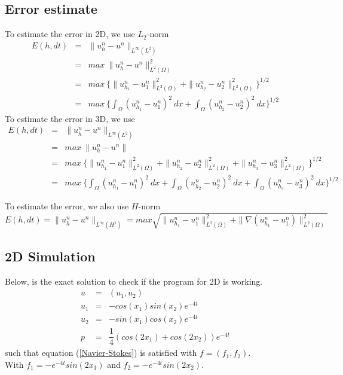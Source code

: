 \documentclass[a4paper,10pt]{article}
\begin{document}
\subsection{Error estimate}
To estimate the error in 2D, we use $ L_{2} $-norm
\begin{eqnarray}\nonumber
E(h,dt) &=& \| u_{h}^{n}-u^{n} \|_{L^\infty(L^2)} \\ \nonumber
&=& max \ \| u_{h}^{n}-u^{n} \|_{L^2(\Omega)}^{2} \\ \nonumber
&=& max \ \{ \| u_{h_{1}}^{n}-u_{1}^{n} \|_{L^2(\Omega)}^{2} + \| u_{h_{2}}^{n}-u_{2}^{n} \|_{L^2(\Omega)}^{2} \}^{1/2} \\ \nonumber
&=& max \ \{ \int_{\Omega} (u_{h_{1}}^{n}-u_{1}^{n})^2 \ dx + \int_{\Omega} (u_{h_{2}}^{n}-u_{2}^{n})^2 \ dx \}^{1/2}
\end{eqnarray}
To estimate the error in 3D, we use
\begin{eqnarray}\nonumber
E(h,dt) &=& \| u_{h}^{n}-u^{n} \|_{L^\infty(L^2)} \\ \nonumber
&=& max \ \| u_{h}^{n}-u^{n} \| \\ \nonumber
&=& max \ \{ \| u_{h_{1}}^{n}-u_{1}^{n} \|_{L^2(\Omega)}^{2} + \| u_{h_{2}}^{n}-u_{2}^{n} \|_{L^2(\Omega)}^{2} + \| u_{h_{3}}^{n}-u_{3}^{n} \|_{L^2(\Omega)}^{2} \}^{1/2} \\ \nonumber
&=& max \ \{ \int_{\Omega} (u_{h_{1}}^{n}-u_{1}^{n})^2 \ dx + \int_{\Omega} (u_{h_{2}}^{n}-u_{2}^{n})^2 \ dx +  \int_{\Omega} (u_{h_{3}}^{n}-u_{3}^{n})^2 \ dx \}^{1/2}
\end{eqnarray}

To estimate the error, we also use $ H $-norm
\[ E(h,dt) = \| u_{h}^{n}-u^{n} \|_{L^\infty(H^{1})} = max \sqrt{\| u_{h_{1}}^{n}-u_{1}^{n} \|_{L^2(\Omega)}^{2} + \| \nabla (u_{h_{1}}^{n}-u_{1}^{n}) \|_{L^2(\Omega)}^{2}} \]

\newpage
\subsection{ 2D Simulation}
Below, is the exact solution to check if the program for 2D is working.
\begin{eqnarray} \nonumber
u &=& (u_{1},u_{2})\\ \nonumber
u_{1} &=& -cos(x_{1}) sin(x_{2}) e^{-4t} \\\nonumber
u_{2} &=& -sin(x_{1}) cos(x_{2}) e^{-4t} \\\nonumber
p &=& \dfrac{1}{4} (cos(2x_{1}) + cos(2x_{2})) e^{-4t}
\end{eqnarray}
such that equation (\ref{Navier-Stokes}) is satisfied with $ f = (f_{1},f_{2}) $. \\With $ f_{1} = -e^{-4t}sin(2x_{1}) $ and $ f_{2} = -e^{-4t} sin(2x_{2}) $.
\end{document}
